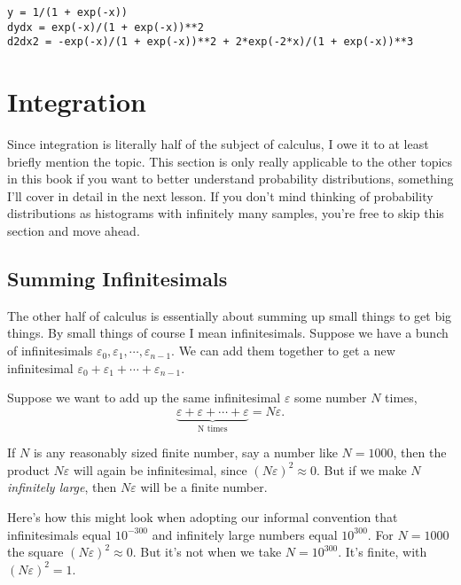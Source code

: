 \documentclass[
  letterpaper,
  DIV=11,
  numbers=noendperiod]{scrreprt}
\begin{document}
\begin{verbatim}
y = 1/(1 + exp(-x))
dydx = exp(-x)/(1 + exp(-x))**2
d2dx2 = -exp(-x)/(1 + exp(-x))**2 + 2*exp(-2*x)/(1 + exp(-x))**3
\end{verbatim}

\hypertarget{integration}{%
\section{Integration}\label{integration}}

Since integration is literally half of the subject of calculus, I owe it
to at least briefly mention the topic. This section is only really
applicable to the other topics in this book if you want to better
understand probability distributions, something I'll cover in detail in
the next lesson. If you don't mind thinking of probability distributions
as histograms with infinitely many samples, you're free to skip this
section and move ahead.

\hypertarget{summing-infinitesimals}{%
\subsection{Summing Infinitesimals}\label{summing-infinitesimals}}

The other half of calculus is essentially about summing up small things
to get big things. By small things of course I mean infinitesimals.
Suppose we have a bunch of infinitesimals
\(\varepsilon_0, \varepsilon_1, \cdots, \varepsilon_{n-1}\). We can add
them together to get a new infinitesimal
\(\varepsilon_0 + \varepsilon_1 + \cdots + \varepsilon_{n-1}\).

Suppose we want to add up the same infinitesimal \(\varepsilon\) some
number \(N\) times,
\[\underbrace{\varepsilon + \varepsilon + \cdots + \varepsilon}_{\text{N times}} = N\varepsilon.\]

If \(N\) is any reasonably sized finite number, say a number like
\(N=1000\), then the product \(N\varepsilon\) will again be
infinitesimal, since \((N\varepsilon)^2 \approx 0\). But if we make
\(N\) \emph{infinitely large}, then \(N\varepsilon\) will be a finite
number.

Here's how this might look when adopting our informal convention that
infinitesimals equal \(10^{-300}\) and infinitely large numbers equal
\(10^{300}\). For \(N=1000\) the square \((N\varepsilon)^2 \approx 0\).
But it's not when we take \(N=10^{300}\). It's finite, with
\((N\varepsilon)^2=1\).
\end{document}
